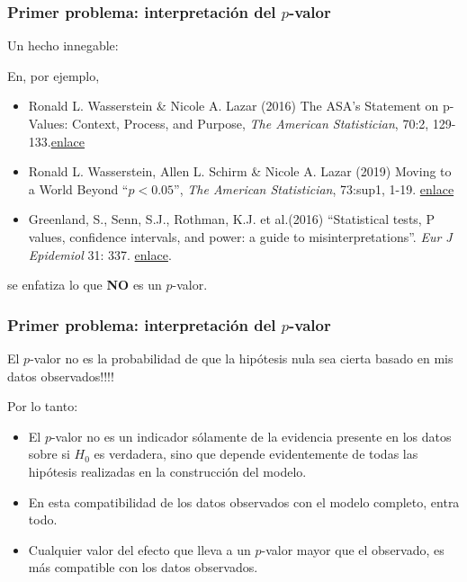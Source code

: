 \documentclass[9pt]{beamer}
\begin{document}
\begin{frame}
  \frametitle{Primer problema: interpretación del $p$-valor}
    \begin{overlayarea}{\textwidth}{0.8\textheight}
  Un hecho innegable:\medskip \onslide<+->

  \begin{center}
  \end{center}\medskip

En, por ejemplo,
\begin{itemize}
\item Ronald L. Wasserstein \& Nicole A. Lazar (2016) The ASA's
  Statement on p-Values: Context, Process, and Purpose, \textit{The
    American Statistician}, 70:2, 129-133.\href{https://doi.org/10.1080/00031305.2016.1154108}{enlace}
\item Ronald L. Wasserstein, Allen L. Schirm \& Nicole A. Lazar (2019)
  Moving to a World Beyond ``$p < 0.05$'', \textit{The American
    Statistician}, 73:sup1, 1-19. \href{https://doi.org/10.1080/00031305.2019.1583913}{enlace}
\item Greenland, S., Senn, S.J., Rothman, K.J. et al.(2016)  ``Statistical tests, P values, confidence intervals, and power: a guide to misinterpretations''. \textit{Eur J Epidemiol}  31: 337. \href{https://doi.org/10.1007/s10654-016-0149-3}{enlace}.
\end{itemize}
se enfatiza lo que \textbf{NO} es un $p$-valor.
\end{overlayarea}
\end{frame}

\begin{frame}
  \frametitle{Primer problema: interpretación del $p$-valor}
    \begin{overlayarea}{\textwidth}{0.8\textheight}
El $p$-valor no es la probabilidad de que la hipótesis nula sea cierta
basado en mis datos observados!!!!

\begin{center}
\end{center}

Por lo tanto:
\begin{itemize}
\item<5-> El $p$-valor no es un indicador sólamente de la evidencia presente en
los datos sobre si $H_0$ es verdadera, sino que depende evidentemente
de todas las hipótesis realizadas en la construcción del
modelo.
\item<6-> En esta compatibilidad de los datos observados con el modelo
  completo, entra todo.
\item<7-> Cualquier valor del efecto que lleva a un $p$-valor mayor
  que el observado, es más compatible con los datos observados. 
\end{itemize}

\end{overlayarea}
\end{frame}
\end{document}
